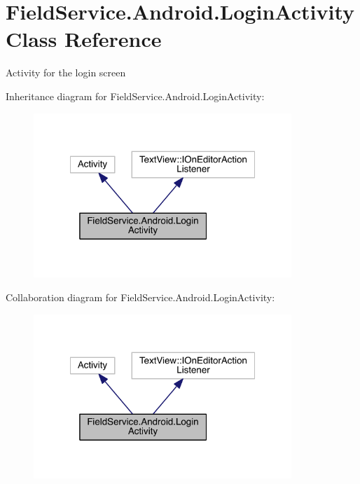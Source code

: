 \hypertarget{class_field_service_1_1_android_1_1_login_activity}{\section{Field\+Service.\+Android.\+Login\+Activity Class Reference}
\label{class_field_service_1_1_android_1_1_login_activity}
}


Activity for the login screen  




Inheritance diagram for Field\+Service.\+Android.\+Login\+Activity\+:
\nopagebreak
\begin{figure}[H]
\begin{center}
\leavevmode
\includegraphics[width=276pt]{class_field_service_1_1_android_1_1_login_activity__inherit__graph}
\end{center}
\end{figure}


Collaboration diagram for Field\+Service.\+Android.\+Login\+Activity\+:
\nopagebreak
\begin{figure}[H]
\begin{center}
\leavevmode
\includegraphics[width=276pt]{class_field_service_1_1_android_1_1_login_activity__coll__graph}
\end{center}
\end{figure}

